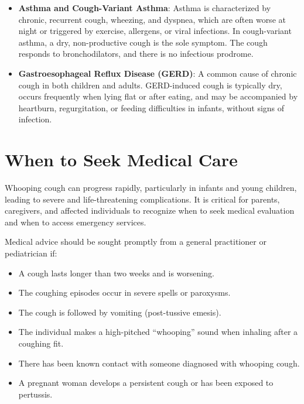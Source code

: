 \begin{itemize}
    \item \textbf{Asthma and Cough-Variant Asthma}: Asthma is characterized by chronic, recurrent cough, wheezing, and dyspnea, which are often worse at night or triggered by exercise, allergens, or viral infections. In cough-variant asthma, a dry, non-productive cough is the sole symptom. The cough responds to bronchodilators, and there is no infectious prodrome.
    \item \textbf{Gastroesophageal Reflux Disease (GERD)}: A common cause of chronic cough in both children and adults. GERD-induced cough is typically dry, occurs frequently when lying flat or after eating, and may be accompanied by heartburn, regurgitation, or feeding difficulties in infants, without signs of infection.
\end{itemize}

\section*{When to Seek Medical Care}
Whooping cough can progress rapidly, particularly in infants and young children, leading to severe and life-threatening complications. It is critical for parents, caregivers, and affected individuals to recognize when to seek medical evaluation and when to access emergency services.

Medical advice should be sought promptly from a general practitioner or pediatrician if:
\begin{itemize}
    \item A cough lasts longer than two weeks and is worsening.
    \item The coughing episodes occur in severe spells or paroxysms.
    \item The cough is followed by vomiting (post-tussive emesis).
    \item The individual makes a high-pitched ``whooping'' sound when inhaling after a coughing fit.
    \item There has been known contact with someone diagnosed with whooping cough.
    \item A pregnant woman develops a persistent cough or has been exposed to pertussis.
\end{itemize}

